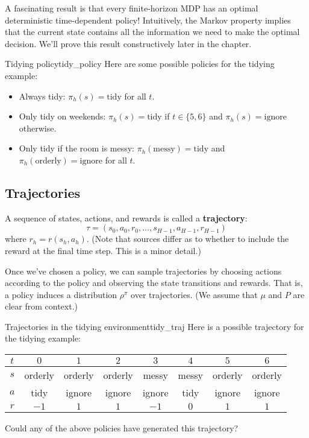 \documentclass[../main/main]{subfiles}
\begin{document}
A fascinating result is that every finite-horizon MDP has an optimal deterministic time-dependent policy! Intuitively, the Markov property implies that the current state contains all the information we need to make the optimal decision. We'll prove this result constructively later in the chapter.


\begin{example}{Tidying policy}{tidy_policy}
    Here are some possible policies for the tidying example:

    \begin{itemize}
        \item Always tidy: $\pi_h(s) = \text{tidy}$ for all $t$.
        \item Only tidy on weekends: $\pi_h(s) = \text{tidy}$ if $t \in \{ 5, 6 \}$ and $\pi_h(s) = \text{ignore}$ otherwise.
        \item Only tidy if the room is messy: $\pi_h(\text{messy}) = \text{tidy}$ and $\pi_h(\text{orderly}) = \text{ignore}$ for all $t$.
    \end{itemize}
\end{example}

\subsection{Trajectories}

A sequence of states, actions, and rewards is called a \textbf{trajectory}:
\[
    \tau = (s_0, a_0, r_0, \dots, s_{H-1}, a_{H-1}, r_{H-1})
\]
where $r_h = r(s_h, a_h)$. (Note that sources differ as to whether to include the reward at the final time step. This is a minor detail.)

Once we've chosen a policy, we can sample trajectories by choosing actions according to the policy and observing the state transitions and rewards. That is, a policy induces a distribution $\rho^{\pi}$ over trajectories. (We assume that $\mu$ and $P$ are clear from context.)

\begin{example}{Trajectories in the tidying environment}{tidy_traj}
    Here is a possible trajectory for the tidying example:

    \begin{center}
    \begin{tabular}{cccccccc}
        $t$ & $0$ & $1$ & $2$ & $3$ & $4$ & $5$ & $6$ \\
        \hline
        $s$ & orderly & orderly & orderly & messy & messy & orderly & orderly \\
        $a$ & tidy & ignore & ignore & ignore & tidy & ignore & ignore \\
        $r$ & $-1$ & $1$ & $1$ & $-1$ & $0$ & $1$ & $1$
    \end{tabular}
    \end{center}

    Could any of the above policies have generated this trajectory?
\end{example}
\end{document}
